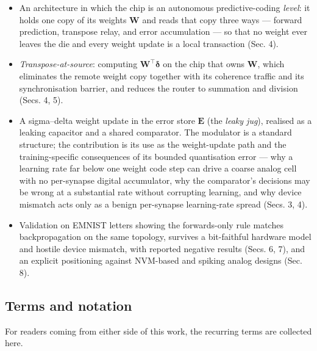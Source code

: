 \documentclass[11pt]{article}
\begin{document}
\begin{itemize}
\item
  An architecture in which the chip is an autonomous predictive-coding
  \emph{level}: it holds one copy of its weights \(\bm W\) and reads
  that copy three ways --- forward prediction, transpose relay, and
  error accumulation --- so that no weight ever leaves the die and every
  weight update is a local transaction (Sec. 4).
\item
  \emph{Transpose-at-source}: computing \(\bm W^{\!\top}\bm\delta\) on
  the chip that owns \(\bm W\), which eliminates the remote weight copy
  together with its coherence traffic and its synchronisation barrier,
  and reduces the router to summation and division (Secs. 4, 5).
\item
  A sigma--delta weight update in the error store \(\bm E\) (the
  \emph{leaky jug}), realised as a leaking capacitor and a shared
  comparator. The modulator is a standard structure; the contribution is
  its use as the weight-update path and the training-specific
  consequences of its bounded quantisation error --- why a learning rate
  far below one weight code step can drive a coarse analog cell with no
  per-synapse digital accumulator, why the comparator's decisions may be
  wrong at a substantial rate without corrupting learning, and why
  device mismatch acts only as a benign per-synapse learning-rate spread
  (Secs. 3, 4).
\item
  Validation on EMNIST letters showing the forwards-only rule matches
  backpropagation on the same topology, survives a bit-faithful hardware
  model and hostile device mismatch, with reported negative results
  (Secs. 6, 7), and an explicit positioning against NVM-based and
  spiking analog designs (Sec. 8).
\end{itemize}

\hypertarget{terms-and-notation}{%
\subsection{Terms and notation}\label{terms-and-notation}}

For readers coming from either side of this work, the recurring terms
are collected here.
\end{document}
